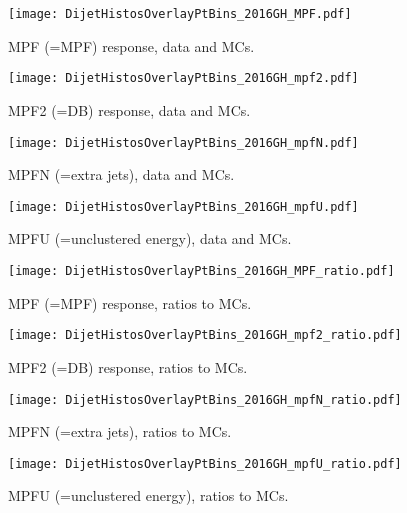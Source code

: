 \documentclass[landscape,10pt]{beamer} %
\begin{document}
\newpage

\begin{figure}[htp]
\centering
\texttt{[image: DijetHistosOverlayPtBins\_2016GH\_MPF.pdf]}
\caption{MPF (=MPF) response, data and MCs.}
\end{figure}
\begin{figure}[htp]
\centering
\texttt{[image: DijetHistosOverlayPtBins\_2016GH\_mpf2.pdf]}
\caption{MPF2 (=DB) response, data and MCs.}
\end{figure}
\begin{figure}[htp]
\centering
\texttt{[image: DijetHistosOverlayPtBins\_2016GH\_mpfN.pdf]}
\caption{MPFN (=extra jets), data and MCs.}
\end{figure}
\begin{figure}[htp]
\centering
\texttt{[image: DijetHistosOverlayPtBins\_2016GH\_mpfU.pdf]}
\caption{MPFU (=unclustered energy), data and MCs.}
\end{figure}

\newpage

\begin{figure}[htp]
\centering
\texttt{[image: DijetHistosOverlayPtBins\_2016GH\_MPF\_ratio.pdf]}
\caption{MPF (=MPF) response, ratios to MCs.}
\end{figure}
\begin{figure}[htp]
\centering
\texttt{[image: DijetHistosOverlayPtBins\_2016GH\_mpf2\_ratio.pdf]}
\caption{MPF2 (=DB) response, ratios to MCs.}
\end{figure}
\begin{figure}[htp]
\centering
\texttt{[image: DijetHistosOverlayPtBins\_2016GH\_mpfN\_ratio.pdf]}
\caption{MPFN (=extra jets), ratios to MCs.}
\end{figure}
\begin{figure}[htp]
\centering
\texttt{[image: DijetHistosOverlayPtBins\_2016GH\_mpfU\_ratio.pdf]}
\caption{MPFU (=unclustered energy), ratios to MCs.}
\end{figure}


\newpage
\end{document}
